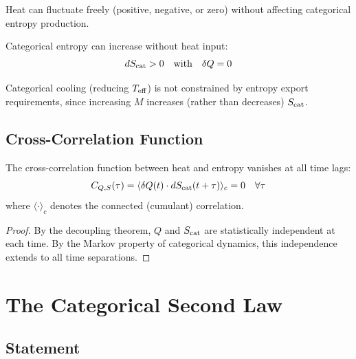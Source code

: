 \begin{corollary}
Heat can fluctuate freely (positive, negative, or zero) without affecting categorical entropy production.
\end{corollary}

\begin{corollary}
Categorical entropy can increase without heat input:
\begin{equation}
dS_{\mathrm{cat}} > 0 \quad \text{with} \quad \delta Q = 0
\end{equation}
\end{corollary}

\begin{corollary}
Categorical cooling (reducing $T_{\mathrm{eff}}$) is not constrained by entropy export requirements, since increasing $M$ increases (rather than decreases) $S_{\mathrm{cat}}$.
\end{corollary}

\subsection{Cross-Correlation Function}

\begin{proposition}
The cross-correlation function between heat and entropy vanishes at all time lags:
\begin{equation}
C_{Q,S}(\tau) = \langle \delta Q(t) \cdot dS_{\mathrm{cat}}(t+\tau) \rangle_c = 0 \quad \forall \tau
\end{equation}
where $\langle \cdot \rangle_c$ denotes the connected (cumulant) correlation.
\end{proposition}

\begin{proof}
By the decoupling theorem, $Q$ and $S_{\mathrm{cat}}$ are statistically independent at each time. By the Markov property of categorical dynamics, this independence extends to all time separations.
\end{proof}

\section{The Categorical Second Law}

\subsection{Statement}

